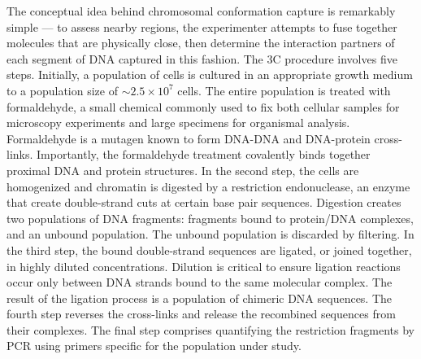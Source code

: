The conceptual idea behind chromosomal conformation capture is remarkably simple --- to assess nearby regions, the experimenter attempts to fuse
together molecules that are physically close, then determine the interaction partners of each segment of DNA captured in this fashion.  The
\gls{3C} procedure involves five steps.   Initially, a population of cells is cultured in an appropriate growth medium to a population size
of $\sim2.5 \times 10^7$ cells\cite{berkum2010}.  The entire population is treated with formaldehyde, a small chemical commonly used to fix both
cellular samples for microscopy experiments and large specimens for organismal analysis.  Formaldehyde is a mutagen known to form DNA-DNA and
DNA-protein cross-links\cite{merk1998}.  Importantly, the formaldehyde treatment covalently binds together proximal DNA and protein structures.
In the second step, the cells are homogenized and chromatin is digested by a restriction endonuclease, an enzyme that create double-strand
cuts at certain base pair sequences\cite{berkum2010}.  Digestion creates two populations of DNA fragments: fragments bound to protein/DNA
complexes, and an unbound population.  The unbound population is discarded by filtering.  In the third step, the bound double-strand sequences
are ligated, or joined together, in highly diluted concentrations. Dilution is critical to ensure ligation reactions occur only between DNA
strands bound to the same molecular complex. The result of the ligation process is a population of chimeric DNA sequences. The fourth step
reverses the cross-links and release the recombined sequences from their complexes.  The final step comprises quantifying the restriction
fragments by PCR using primers specific for the population under study\cite{simonis2007}.

